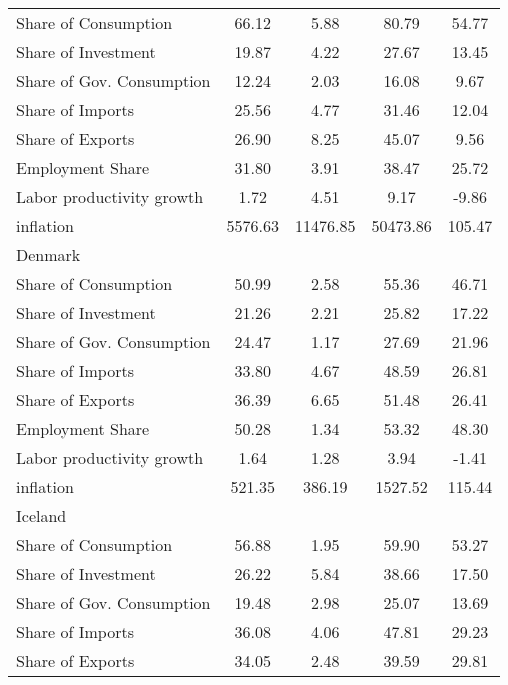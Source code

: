 {\begin{longtable}{l*{1}{cccc}}
Share of Consumption&       66.12&        5.88&       80.79&       54.77\\
Share of Investment &       19.87&        4.22&       27.67&       13.45\\
Share of Gov. Consumption&       12.24&        2.03&       16.08&        9.67\\
Share of Imports    &       25.56&        4.77&       31.46&       12.04\\
Share of Exports    &       26.90&        8.25&       45.07&        9.56\\
Employment Share    &       31.80&        3.91&       38.47&       25.72\\
Labor productivity growth&        1.72&        4.51&        9.17&       -9.86\\
inflation           &     5576.63&    11476.85&    50473.86&      105.47\\
Denmark             &            &            &            &            \\
Share of Consumption&       50.99&        2.58&       55.36&       46.71\\
Share of Investment &       21.26&        2.21&       25.82&       17.22\\
Share of Gov. Consumption&       24.47&        1.17&       27.69&       21.96\\
Share of Imports    &       33.80&        4.67&       48.59&       26.81\\
Share of Exports    &       36.39&        6.65&       51.48&       26.41\\
Employment Share    &       50.28&        1.34&       53.32&       48.30\\
Labor productivity growth&        1.64&        1.28&        3.94&       -1.41\\
inflation           &      521.35&      386.19&     1527.52&      115.44\\
Iceland             &            &            &            &            \\
Share of Consumption&       56.88&        1.95&       59.90&       53.27\\
Share of Investment &       26.22&        5.84&       38.66&       17.50\\
Share of Gov. Consumption&       19.48&        2.98&       25.07&       13.69\\
Share of Imports    &       36.08&        4.06&       47.81&       29.23\\
Share of Exports    &       34.05&        2.48&       39.59&       29.81\\

\end{longtable}}
